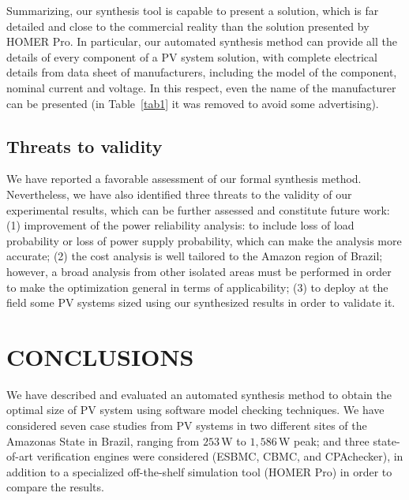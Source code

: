 \documentclass[review]{elsarticle}
\begin{document}
Summarizing, our synthesis tool is capable to present a 
solution, which is far detailed and close to the commercial 
reality than the solution presented by HOMER Pro. 
In particular, our automated synthesis method 
can provide all the details of every component of 
a PV system solution, with complete electrical details 
from data sheet of manufacturers, including 
the model of the component, nominal current and voltage. 
In this respect, even the name of the manufacturer 
can be presented (in Table~\ref{tab1} it was removed 
to avoid some advertising).

\subsection{Threats to validity}

We have reported a favorable assessment of our formal synthesis method. 
Nevertheless, we have also identified three threats to the validity 
of our experimental results, which can be further assessed and 
constitute future work: (1) improvement of the power reliability 
analysis: to include loss of load probability or loss of power 
supply probability, which can make the analysis more accurate; 
(2) the cost analysis is well tailored to the Amazon region of Brazil; 
however, a broad analysis from other isolated areas must be 
performed in order to make the optimization general in terms 
of applicability; (3) to deploy at the field some PV systems 
sized using our synthesized results in order to validate it.

\section{CONCLUSIONS}
\label{sec:Conclusion}

We have described and evaluated an automated synthesis method 
to obtain the optimal size of PV system using software model 
checking techniques. We have considered seven case studies 
from PV systems in two different sites of the Amazonas State 
in Brazil, ranging from $253$\,W to $1,586$\,W peak; and 
three state-of-art verification engines were considered 
(ESBMC, CBMC, and CPAchecker), in addition to a specialized 
off-the-shelf simulation tool (HOMER Pro) in order to compare the results.
\end{document}
